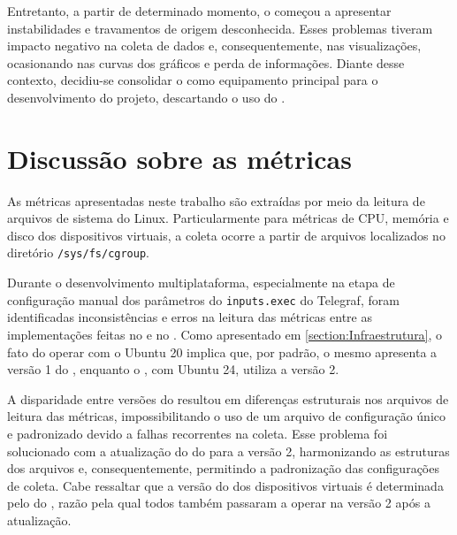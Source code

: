 Entretanto, a partir de determinado momento, o  começou a apresentar instabilidades e travamentos de origem desconhecida. Esses problemas tiveram impacto negativo na coleta de dados e, consequentemente, nas visualizações, ocasionando  nas curvas dos gráficos e perda de informações. Diante desse contexto, decidiu-se consolidar o  como equipamento principal para o desenvolvimento do projeto, descartando o uso do .



\section{Discussão sobre as métricas}
\label{section:DiscussaoMetricas}

As métricas apresentadas neste trabalho são extraídas por meio da leitura de arquivos de sistema do Linux. Particularmente para métricas de CPU, memória e disco dos dispositivos virtuais, a coleta ocorre a partir de arquivos localizados no diretório \verb|/sys/fs/cgroup|.

Durante o desenvolvimento multiplataforma, especialmente na etapa de configuração manual dos parâmetros do \verb|inputs.exec| do Telegraf, foram identificadas inconsistências e erros na leitura das métricas entre as implementações feitas no  e no . Como apresentado em \ref{section:Infraestrutura}, o fato do  operar com o Ubuntu 20 implica que, por padrão, o mesmo apresenta a versão 1 do , enquanto o , com Ubuntu 24, utiliza a versão 2.

A disparidade entre versões do  resultou em diferenças estruturais nos arquivos de leitura das métricas, impossibilitando o uso de um arquivo de configuração único e padronizado devido a falhas recorrentes na coleta. Esse problema foi solucionado com a atualização do  do  para a versão 2, harmonizando as estruturas dos arquivos e, consequentemente, permitindo a padronização das configurações de coleta. Cabe ressaltar que a versão do  dos dispositivos virtuais é determinada pelo  do , razão pela qual todos também passaram a operar na versão 2 após a atualização.

